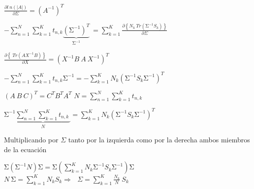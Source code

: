 \documentclass{article}
\begin{document}
\begin{center}
    $\displaystyle \frac{\partial l\ n{\left(\left|A\right|\right)}}{\partial\Sigma}=\left(A^{-1}\right)^T $
\end{center}

$ \displaystyle
    -\sum_{n=1}^{N}{
        \sum_{k=1}^{K}{
            t_{n,k}{\underbrace{\left(\mathrm{\Sigma}^{-1}\right)^T}_{\mathrm{\Sigma}^{-1}}}\ 
        }
    }=\sum_{k=1}^{K}{
        \frac{\partial\left\{N_k\ Tr\left(\mathrm{\Sigma}^{-1}S_k\right)\right\}}{\partial\Sigma}
    }
$

\begin{center}
    $\displaystyle \frac{\partial\left\{\ Tr\left(AX^{-1}B\right)\right\}}{\partial X}=\left(X^{-1}B\ A\ X^{-1}\right)^T $
\end{center}

$\displaystyle
    -\sum_{n=1}^{N}\sum_{k=1}^{K}{t_{n,k}\mathrm{\Sigma}^{-1}}=-\sum_{k=1}^{K}N_k\left(\mathrm{\Sigma}^{-1}S_k\mathrm{\Sigma}^{-1}\right)^T
$

\begin{center}
    $\displaystyle \left(A\ B\ C\right)^T=C^TB^TA^T $
    $\displaystyle N=\sum_{n=1}^{N}\sum_{k=1}^{K}{t_{n,k}\ } $
\end{center}

$\displaystyle
    \mathrm{\Sigma}^{-1}\underbrace{
    \sum_{n=1}^{N}{
        \sum_{k=1}^{K}{
            t_{n,k}\ 
        }
    }
    }_N
     =\sum_{k=1}^{K}{
        N_k\left(\mathrm{\Sigma}^{-1}S_k\mathrm{\Sigma}^{-1}\right)^T
     }
$

\begin{center}
    Multiplicando por $\Sigma$ tanto por la izquierda como por la derecha ambos miembros de la ecuaci\'on
\end{center}

$\displaystyle
    \mathrm{\Sigma}\left(\mathrm{\Sigma}^{-1}N\right)\mathrm{\Sigma}=\mathrm{\Sigma}\left(\sum_{k=1}^{K}N_k\mathrm{\Sigma}^{-1}S_k\mathrm{\Sigma}^{-1}\right)\mathrm{\Sigma}
$
$\displaystyle
    N\ \mathrm{\Sigma}=\sum_{k=1}^{K}{N_kS_k}\Longrightarrow\ \ \ \Sigma=\sum_{k=1}^{K}{\frac{N_k}{N}\ S_k}
$
\end{document}
